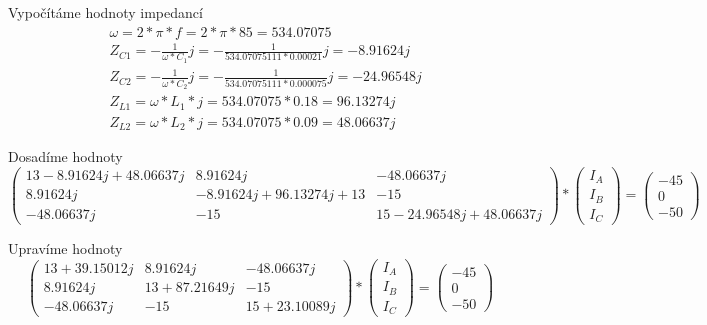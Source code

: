 Vypočítáme hodnoty impedancí
\begin{align*}
    & \omega = 2 * \pi * f = 2 * \pi * 85 = 534.07075 \\
    & Z_{C1} = -\frac {1} {\omega * C_1}j = -\frac {1} {534.07075111 * 0.00021}j = -8.91624j\\
    & Z_{C2} = -\frac {1} {\omega * C_2}j = -\frac {1} {534.07075111 * 0.000075}j = -24.96548j\\
    & Z_{L1} = \omega * L_1 * j = 534.07075 * 0.18 = 96.13274j \\
    & Z_{L2} = \omega * L_2 * j = 534.07075 * 0.09 = 48.06637j
\end{align*}

Dosadíme hodnoty
\begin{equation*}
    \begin{pmatrix}
        13 - 8.91624j + 48.06637j & 8.91624j & -48.06637j \\
        8.91624j & -8.91624j + 96.13274j + 13 & -15 \\
        -48.06637j & -15 & 15 -24.96548j + 48.06637j
    \end{pmatrix}
    *
    \begin{pmatrix}
        I_A \\
        I_B \\
        I_C
    \end{pmatrix}
    =
    \begin{pmatrix}
        -45 \\
        0 \\
        -50
    \end{pmatrix}
\end{equation*}

Upravíme hodnoty
\begin{equation*}
    \begin{pmatrix}
        13 + 39.15012j & 8.91624j & -48.06637j \\
        8.91624j & 13 + 87.21649j & -15 \\
        -48.06637j & -15 & 15 + 23.10089j
    \end{pmatrix}
    *
    \begin{pmatrix}
        I_A \\
        I_B \\
        I_C
    \end{pmatrix}
    =
    \begin{pmatrix}
        -45 \\
        0 \\
        -50
    \end{pmatrix}
\end{equation*}


